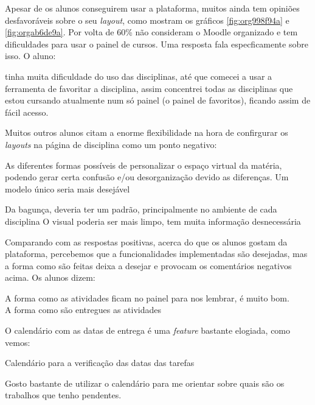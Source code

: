 \documentclass[11pt]{article}
\renewenvironment{quote}{\small\list{}{\rightmargin=0cm \leftmargin=4cm}\item[]\relax}{\endlist}
\begin{document}
Apesar de os alunos conseguirem usar a plataforma, muitos ainda tem
opiniões desfavoráveis sobre o seu \emph{layout}, como mostram os gráficos
\ref{fig:org998f94a} e \ref{fig:orgab6de9a}. Por volta de 60\% não consideram o Moodle
organizado e tem dificuldades para usar o painel de cursos. Uma
resposta fala especficamente sobre isso. O aluno:

\begin{quote}
[\ldots{}] tinha muita dificuldade do uso das disciplinas, até
que comecei a usar a ferramenta de favoritar a disciplina, assim
concentrei todas as disciplinas que estou cursando atualmente num só
painel (o painel de favoritos), ficando assim de fácil acesso.
\end{quote}

Muitos outros alunos citam a enorme flexibilidade na hora de
confirgurar os \emph{layouts} na página de disciplina como um ponto
negativo:

\begin{quote}
As diferentes formas possíveis de personalizar o espaço virtual da
matéria, podendo gerar certa confusão e/ou desorganização devido as
diferenças. Um modelo único seria mais desejável
\end{quote}


\begin{quote}
Da bagunça, deveria ter um padrão, principalmente no ambiente de cada
disciplina O visual poderia ser mais limpo, tem muita informação
desnecessária
\end{quote}

Comparando com as respostas positivas, acerca do que os alunos gostam
da plataforma, percebemos que a funcionalidades implementadas são
desejadas, mas a forma como são feitas deixa a desejar e provocam os
comentários negativos acima.
Os alunos dizem:

\begin{quote}
A forma como as atividades ficam no painel para nos lembrar, é muito
  bom.\\
A forma como são entregues as atividades
\end{quote}

O calendário com as datas de entrega é uma \emph{feature} bastante
elogiada, como vemos:

\begin{quote}
Calendário para a verificação das datas das tarefas
\end{quote}

\begin{quote}
Gosto bastante de utilizar o calendário para me orientar sobre quais
são os trabalhos que tenho pendentes.
\end{quote}
\end{document}
